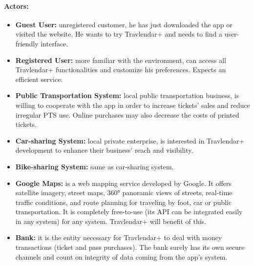 \documentclass{article}
\begin{document}
\paragraph{Actors:}
\begin{itemize}
\item \textbf{Guest User:} unregistered customer, he has just downloaded the app or visited the website. He wants to try Travlendar+ and needs to find a user-friendly interface.
\item \textbf{Registered User:} more familiar with the environment, can access all Travlendar+ functionalities and customize his preferences. Expects an efficient service.
\item \textbf{Public Transportation System:} local public transportation business, is willing to cooperate with the app in order to increase tickets’ sales and reduce irregular PTS use. Online purchases may also decrease the costs of printed tickets. 
\item \textbf{Car-sharing System:} local private enterprise, is interested in Travlendar+ development to enhance their business’ reach and visibility. 
\item \textbf{Bike-sharing System:} same as car-sharing system.
\item \textbf{Google Maps:} is a web mapping service developed by Google. It offers satellite imagery, street maps, 360° panoramic views of streets, real-time traffic conditions, and route planning for traveling by foot, car or public transportation. It is completely free-to-use (its API can be integrated easily in any system) for any system. Travlendar+ will benefit of this.
\item \textbf{Bank:} it is the entity necessary for Travlendar+ to deal with money transactions (ticket and pass purchases). The bank surely has its own secure channels and count on integrity of data coming from the app’s system.
\end{itemize}
\end{document}

